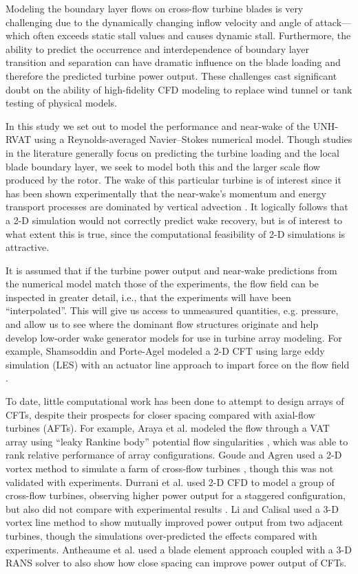 Modeling the boundary layer flows on cross-flow turbine blades is very
challenging due to the dynamically changing inflow velocity and angle of
attack---which often exceeds static stall values and causes dynamic stall.
Furthermore, the ability to predict the occurrence and interdependence of
boundary layer transition and separation can have dramatic influence on the
blade loading and therefore the predicted turbine power output. These challenges
cast significant doubt on the ability of high-fidelity CFD modeling to replace
wind tunnel or tank testing of physical models.

In this study we set out to model the performance and near-wake of the UNH-RVAT
using a Reynolds-averaged Navier--Stokes numerical model. Though studies in the
literature generally focus on predicting the turbine loading and the local blade
boundary layer, we seek to model both this and the larger scale flow produced by
the rotor. The wake of this particular turbine is of interest since it has been
shown experimentally that the near-wake's momentum and energy transport
processes are dominated by vertical advection \cite{Bachant2015-JoT}. It
logically follows that a 2-D simulation would not correctly predict wake
recovery, but is of interest to what extent this is true, since the
computational feasibility of 2-D simulations is attractive.

It is assumed that if the turbine power output and near-wake predictions from
the numerical model match those of the experiments, the flow field can be
inspected in greater detail, i.e., that the experiments will have been
``interpolated''. This will give us access to unmeasured quantities, e.g.
pressure, and allow us to see where the dominant flow structures originate and
help develop low-order wake generator models for use in turbine array modeling.
For example, Shamsoddin and Porte-Agel modeled a 2-D CFT using large eddy
simulation (LES) with an actuator line approach to impart force on the flow
field \cite{Shamsoddin2014}.

To date, little computational work has been done to attempt to design arrays of
CFTs, despite their prospects for closer spacing compared with axial-flow
turbines (AFTs). For example, Araya et al. modeled the flow through a VAT array
using ``leaky Rankine body'' potential flow singularities \cite{Araya2014},
which was able to rank relative performance of array configurations. Goude and
Agren used a 2-D vortex method to simulate a farm of cross-flow turbines
\cite{Goude2010}, though this was not validated with experiments. Durrani et al.
used 2-D CFD to model a group of cross-flow turbines, observing higher power
output for a staggered configuration, but also did not compare with experimental
results \cite{Durrani2011}. Li and Calisal \cite{Li2010} used a 3-D vortex line
method to show mutually improved power output from two adjacent turbines, though
the simulations over-predicted the effects compared with experiments. Antheaume
et al. \cite{Antheaume2008} used a blade element approach coupled with a 3-D
RANS solver to also show how close spacing can improve power output of CFTs.

